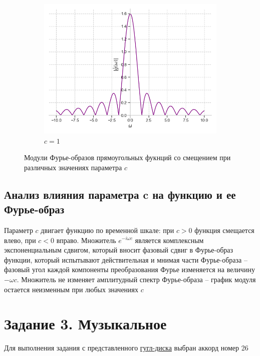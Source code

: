\documentclass[a4paper, 16pt]{article}
\begin{document}
\begin{figure}[htbp]
\begin{subfigure}{0.3\textwidth}
            \centering
            \includegraphics[width=\linewidth]{sh_1_abs_rectf_int12.png}
            \caption{$c=1$}
            \label{fig:absshrectf_3}
        \end{subfigure}
        \caption{Модули Фурье-образов прямоугольных фукнций со смещением при различных значениях параметра $c$}
        \label{fig:absshrectfs}
    \end{figure}


    \subsection{Анализ влияния параметра $\boldsymbol{c}$ на функцию и ее Фурье-образ}
    \noindent Параметр $c$ двигает функцию по временной шкале: при $c>0$ функция смещается
    влево, при $c<0$ вправо. Множитель $e^{-i\omega c}$
    является комплексным экспоненциальным сдвигом, который вносит фазовый сдвиг в Фурье-образ
    функции, который испытывают действительная и мнимая части Фурье-образа
    -- фазовый угол каждой компоненты преобразования Фурье изменяется на величину $-\omega c$.
    Множитель не изменяет амплитудный спектр Фурье-образа -- график модуля остается неизменным при любых значениях $c$


    \newpage
    \section{Задание 3. Музыкальное}
    \noindent Для выполнения задания с представленного \href{https://drive.google.com/drive/folders/14lwzvV84uXtyuXXspoYUSf-VdR52t0sE}{гугл-диска}
    выбран аккорд номер 26
\end{document}
